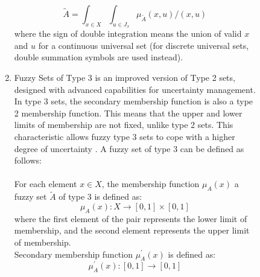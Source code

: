 \documentclass{article}
\begin{document}
\begin{figure}[!t]
\begin{minipage}{0.49\textwidth}
\begin{enumerate}
                $$\tilde{A}=\int_{x\in X}\int_{u\in J_{x}} \mu_{\tilde{A}}(x,u) / (x,u)$$
                where the sign of double integration means the union of valid $x$ and $u$ for a continuous universal set (for discrete universal sets, double summation symbols are used instead).
                \item Fuzzy Sets of Type 3 is an improved version of Type 2 sets, designed with advanced capabilities for uncertainty management. In type 3 sets, the secondary membership function is also a type 2 membership function. This means that the upper and lower limits of membership are not fixed, unlike type 2 sets. This characteristic allows fuzzy type 3 sets to cope with a higher degree of uncertainty \cite{litlink22}. A fuzzy set of type 3 can be defined as follows:\\
                ~\\
                For each element \(x \in X\), the membership function \(\mu_{A}(x)\) a fuzzy set \(\tilde{A}\) of type 3 is defined as:\\
                \[\mu_{A}(x) : X \rightarrow [0,1] \times [0,1]\]
                where the first element of the pair represents the lower limit of membership, and the second element represents the upper limit of membership.\\
                Secondary membership function \(\mu_{A}^{'}(x)\) is defined as:\\
                \[\mu_{A}^{'}(x) : [0,1] \rightarrow [0,1]\]
            \end{enumerate}
            ~\\
            ~\\
            ~\\
            ~\\
            ~\\
            ~\\
            ~\\
            ~\\
            ~\\
            ~\\
            ~\\
            ~\\
            ~\\
            ~\\
            ~\\
            ~\\
            ~\\
            ~\\

\end{minipage}
\end{figure}
\end{document}
